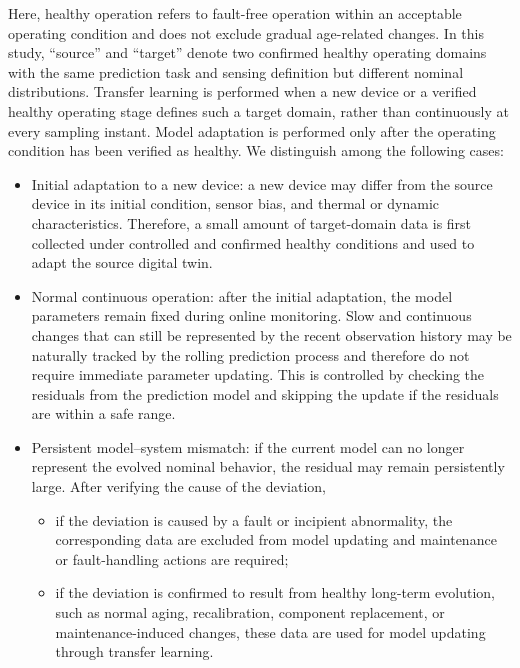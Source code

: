 \documentclass[a4paper,10pt]{cas-sc}%
\newcommand{\rev}[1]{#1}
\newcommand{\roundtworev}[1]{\textcolor{roundtwored}{#1}}
\begin{document}
\rev{\roundtworev{Here, healthy operation refers to fault-free operation within an acceptable operating condition and does not exclude gradual age-related changes.} \roundtworev{In this study, ``source'' and ``target'' denote two confirmed healthy operating domains with the same prediction task and sensing definition but different nominal distributions.} Transfer learning is performed when a new device or a verified healthy operating stage defines such a target domain, rather than continuously at every sampling instant. \roundtworev{Model adaptation is performed only after the operating condition has been verified as healthy.} We distinguish among the following cases:}
\begin{itemize}
	\item \rev{Initial adaptation to a new device: a new device may differ from the source device in its initial condition, sensor bias, and thermal or dynamic characteristics. Therefore, a small amount of target-domain data is first collected under controlled and confirmed healthy conditions and used to adapt the source digital twin.}
	\item \rev{Normal continuous operation: after the initial adaptation, the model parameters remain fixed during online monitoring. Slow and continuous changes that can still be represented by the recent observation history may be naturally tracked by the rolling prediction process and therefore do not require immediate parameter updating. This is controlled by checking the residuals from the prediction model and skipping the update if the residuals are within a safe range.}
	\item \rev{Persistent model--system mismatch: }\roundtworev{if the current model can no longer represent the evolved nominal behavior, the residual may remain persistently large. After verifying the cause of the deviation,}
	\begin{itemize}
		\item \rev{if the deviation is caused by a fault or incipient abnormality, the corresponding data are excluded from model updating and maintenance or fault-handling actions are required;}
		\item \rev{if the deviation is confirmed to result from healthy long-term evolution, such as normal aging, recalibration, component replacement, or maintenance-induced changes, these data are used for model updating through transfer learning.}
	\end{itemize}
\end{itemize} 
\end{document}

